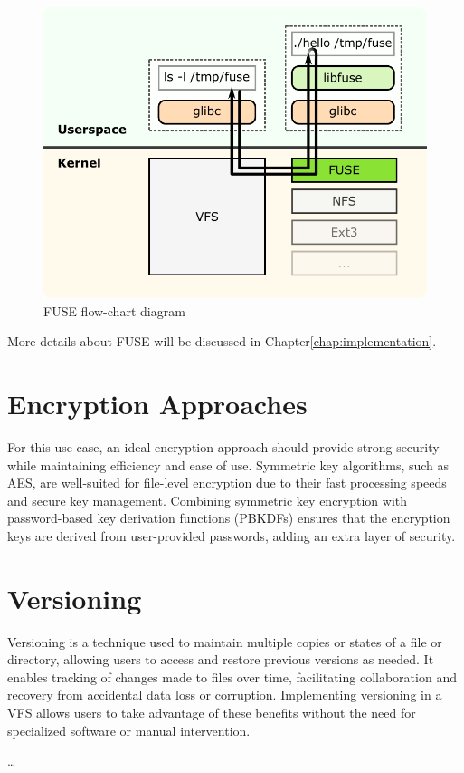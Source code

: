 \begin{figure}[ht]
    \centering
    \includegraphics[width=\linewidth]{img/fuse_diagram}
    \caption{FUSE flow-chart diagram}
    \label{fig:fuse-diagram}
\end{figure}

More details about FUSE will be discussed in Chapter\ref{chap:implementation}.

\section{Encryption Approaches}\label{sec:encryption-approaches}

For this use case, an ideal encryption approach should provide strong security while maintaining efficiency and ease of use.
Symmetric key algorithms, such as AES, are well-suited for file-level encryption due to their fast processing speeds and secure key management.
Combining symmetric key encryption with password-based key derivation functions (PBKDFs) ensures that the encryption keys are derived from user-provided passwords, adding an extra layer of security.

\section{Versioning}\label{sec:versioning}

Versioning is a technique used to maintain multiple copies or states of a file or directory, allowing users to access and restore previous versions as needed.
It enables tracking of changes made to files over time, facilitating collaboration and recovery from accidental data loss or corruption.
Implementing versioning in a VFS allows users to take advantage of these benefits without the need for specialized software or manual intervention.



\ldots